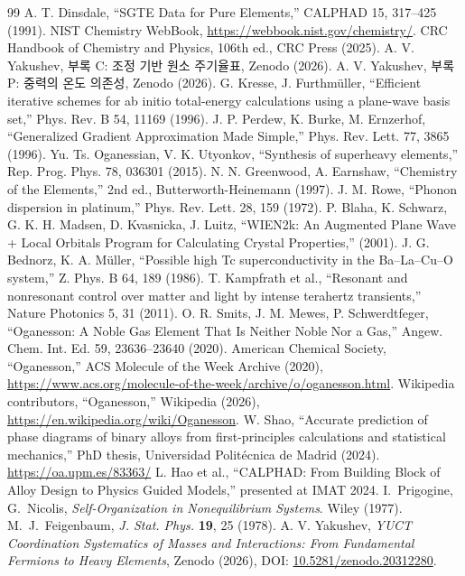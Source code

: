 \documentclass[11pt,a4paper]{article}
\begin{document}
	\begin{thebibliography}{99}
		 A. T. Dinsdale, ``SGTE Data for Pure Elements,'' CALPHAD 15, 317–425 (1991).
		 NIST Chemistry WebBook, \url{https://webbook.nist.gov/chemistry/}.
		 CRC Handbook of Chemistry and Physics, 106th ed., CRC Press (2025).
		 A. V. Yakushev, 부록 C: 조정 기반 원소 주기율표, Zenodo (2026).
		 A. V. Yakushev, 부록 P: 중력의 온도 의존성, Zenodo (2026).
		 G. Kresse, J. Furthmüller, ``Efficient iterative schemes for ab initio total-energy calculations using a plane-wave basis set,'' Phys. Rev. B 54, 11169 (1996).
		 J. P. Perdew, K. Burke, M. Ernzerhof, ``Generalized Gradient Approximation Made Simple,'' Phys. Rev. Lett. 77, 3865 (1996).
		 Yu. Ts. Oganessian, V. K. Utyonkov, ``Synthesis of superheavy elements,'' Rep. Prog. Phys. 78, 036301 (2015).
		 N. N. Greenwood, A. Earnshaw, ``Chemistry of the Elements,'' 2nd ed., Butterworth-Heinemann (1997).
		 J. M. Rowe, ``Phonon dispersion in platinum,'' Phys. Rev. Lett. 28, 159 (1972).
		 P. Blaha, K. Schwarz, G. K. H. Madsen, D. Kvasnicka, J. Luitz, ``WIEN2k: An Augmented Plane Wave + Local Orbitals Program for Calculating Crystal Properties,'' (2001).
		 J. G. Bednorz, K. A. Müller, ``Possible high Tc superconductivity in the Ba–La–Cu–O system,'' Z. Phys. B 64, 189 (1986).
		 T. Kampfrath et al., ``Resonant and nonresonant control over matter and light by intense terahertz transients,'' Nature Photonics 5, 31 (2011).
		 O. R. Smits, J. M. Mewes, P. Schwerdtfeger, ``Oganesson: A Noble Gas Element That Is Neither Noble Nor a Gas,'' Angew. Chem. Int. Ed. 59, 23636–23640 (2020).
		 American Chemical Society, ``Oganesson,'' ACS Molecule of the Week Archive (2020), \url{https://www.acs.org/molecule-of-the-week/archive/o/oganesson.html}.
		 Wikipedia contributors, ``Oganesson,'' Wikipedia (2026), \url{https://en.wikipedia.org/wiki/Oganesson}.
		 W. Shao, ``Accurate prediction of phase diagrams of binary alloys from first-principles calculations and statistical mechanics,'' PhD thesis, Universidad Politécnica de Madrid (2024). \url{https://oa.upm.es/83363/}
		 L. Hao et al., ``CALPHAD: From Building Block of Alloy Design to Physics Guided Models,'' presented at IMAT 2024.
		 I.~Prigogine, G.~Nicolis, \emph{Self-Organization in Nonequilibrium Systems}. Wiley (1977).
		 M.~J.~Feigenbaum, \emph{J. Stat. Phys.} \textbf{19}, 25 (1978).
		 A. V. Yakushev, \emph{YUCT Coordination Systematics of Masses and Interactions: From Fundamental Fermions to Heavy Elements}, Zenodo (2026), DOI: \href{https://doi.org/10.5281/zenodo.20312280}{10.5281/zenodo.20312280}.
	\end{thebibliography}
	
\end{document}
